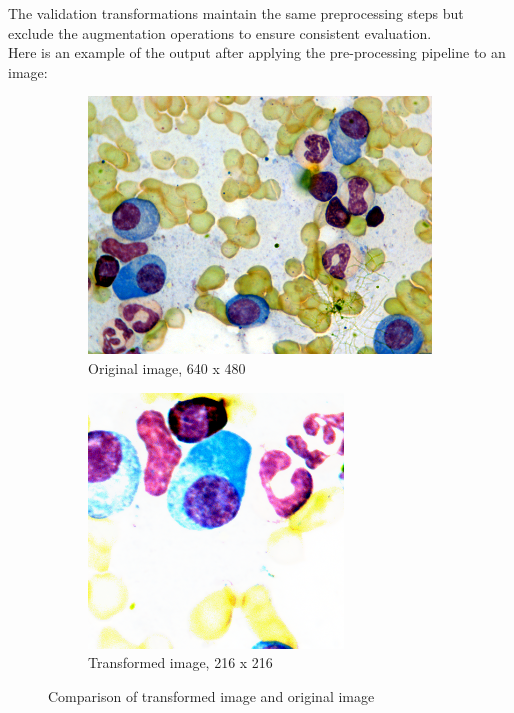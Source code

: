 \documentclass[]{article}
\begin{document}
The validation transformations maintain the same preprocessing steps but exclude the augmentation operations to ensure consistent evaluation.\\
Here is an example of the output after applying the pre-processing pipeline to an image:
\begin{figure}[!h]
    \centering
    \begin{subfigure}[b]{0.45\textwidth}
        \centering
        \includegraphics[scale=0.2]{reports/images/cell_00001.png}
        \caption{Original image, 640 x 480}
    \end{subfigure}
    \hfill
    \begin{subfigure}[b]{0.45\textwidth}
        \centering
        \includegraphics[scale=0.4]{reports/images/transformed_cell_00001.png}
        \caption{Transformed image, 216 x 216}
    \end{subfigure}
    \caption{Comparison of transformed image and original image}
    \label{fig:transformed_images}
\end{figure}
\end{document}
